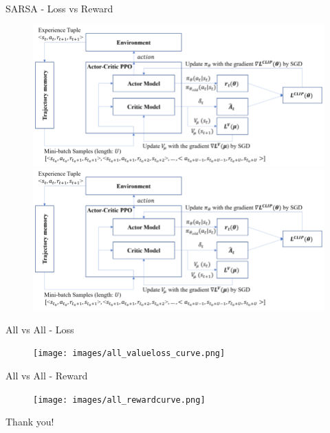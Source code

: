 \documentclass[serif]{beamer}  %
\begin{document}
\begin{frame}{SARSA - Loss vs Reward}
    \begin{figure}
        \centering
        \includegraphics[width=\linewidth]{images/PPO_diagram.png}
        \includegraphics[width=\linewidth]{images/PPO_diagram.png}
    \end{figure}
\end{frame}

\begin{frame}{All vs All - Loss}
    \begin{figure}
        \centering
        \texttt{[image: images/all\_valueloss\_curve.png]}
    \end{figure}
\end{frame}

\begin{frame}{All vs All - Reward}
    \begin{figure}
        \centering
        \texttt{[image: images/all\_rewardcurve.png]}
    \end{figure}
\end{frame}


\begin{frame}
\centering
{\Huge Thank you!}
\end{frame}



\end{document}
